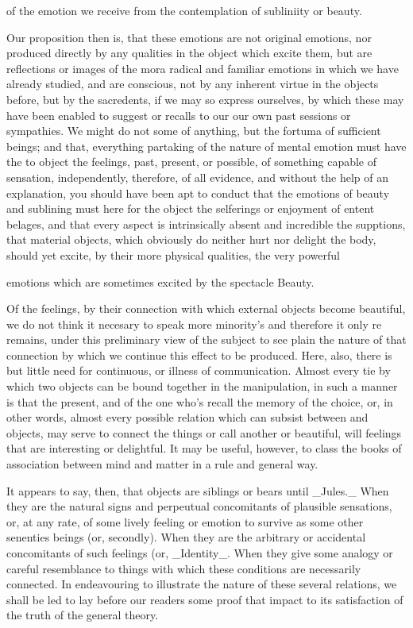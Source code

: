 of the emotion we receive from the contemplation of subliniity or beauty.\par\medskip
Our proposition then is, that these emotions are not original emotions, nor produced directly by any qualities in the object which excite them, but are reflections or images of the mora radical and familiar emotions in which we have already studied, and are conscious, not by any inherent virtue in the objects before, but by the sacredents, if we may so express ourselves, by which these may have been enabled to suggest or recalls to our our own past sessions or sympathies. We might do not some of anything, but the fortuma of sufficient beings; and that, everything partaking of the nature of mental emotion must have the to object the feelings, past, present, or possible, of something capable of sensation, independently, therefore, of all evidence, and without the help of an explanation, you should have been apt to conduct that the emotions of beauty and sublining must here for the object the selferings or enjoyment of entent belages, and that every aspect is intrinsically absent and incredible the supptions, that material objects, which obviously do neither hurt nor delight the body, should yet excite, by their more physical qualities, the very powerful\par\medskip
emotions which are sometimes excited by the spectacle Beauty.\par\medskip
Of the feelings, by their connection with which external objects become beautiful, we do not think it necesary to speak more minority’s and therefore it only re remains, under this preliminary view of the subject to see plain the nature of that connection by which we continue this effect to be produced. Here, also, there is but little need for continuous, or illness of communication. Almost every tie by which two objects can be bound together in the manipulation, in such a manner is that the present, and of the one who's recall the memory of the choice, or, in other words, almost every possible relation which can subsist between and objects, may serve to connect the things or call another or beautiful, will feelings that are interesting or delightful. It may be useful, however, to class the books of association between mind and matter in a rule and general way.\par\medskip
It appears to say, then, that objects are siblings or bears until \_Jules.\_ When they are the natural signs and perpeutual concomitants of plausible sensations, or, at any rate, of some lively feeling or emotion to survive as some other senenties beings (or, secondly). When they are the arbitrary or accidental concomitants of such feelings (or, \_Identity\_. When they give some analogy or careful resemblance to things with which these conditions are necessarily connected. In endeavouring to illustrate the nature of these several relations, we shall be led to lay before our readers some proof that impact to its satisfaction of the truth of the general theory.\par\medskip
